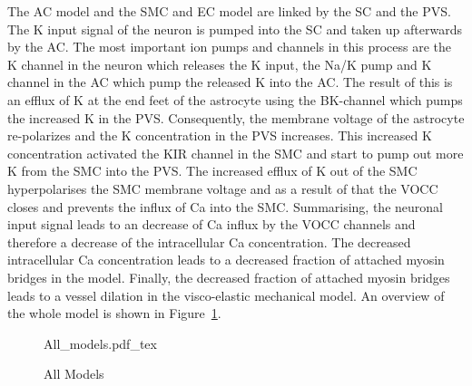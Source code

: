 The \gls{AC} model and the \gls{SMC} and \gls{EC} model are linked by the SC and the \gls{PVS}. The \gls{K} input signal of the neuron is pumped into the \gls{SC} and taken up afterwards by the AC. The most important ion pumps and channels in this process are the \gls{K} channel in the neuron which releases the \gls{K} input,  the \gls{Na}/\gls{K} pump and \gls{K} channel in the \gls{AC} which pump the released \gls{K} into the AC.
The result of this is an efflux of \gls{K} at the end feet of the astrocyte using the BK-channel which pumps the increased \gls{K} in the \gls{PVS}. Consequently, the membrane voltage of the astrocyte re-polarizes and the \gls{K} concentration in the PVS increases. This increased \gls{K} concentration activated the KIR channel in the \gls{SMC} and start to pump out more \gls{K} from the \gls{SMC} into the \gls{PVS}. The increased efflux of \gls{K} out of the SMC hyperpolarises the \gls{SMC} membrane voltage and as a result of that the VOCC closes and prevents the influx of \gls{Ca} into the \gls{SMC}.
Summarising, the neuronal input signal leads to an decrease of \gls{Ca} influx by the VOCC channels and therefore a decrease of the intracellular \gls{Ca} concentration. The decreased intracellular \gls{Ca} concentration leads to a decreased fraction of attached myosin bridges in the \citet{Hai1989} model.
Finally, the decreased fraction of attached myosin bridges leads to a vessel dilation in the visco-elastic mechanical model. An overview of the whole model is shown in Figure~\ref{Overview}.

\begin{figure}[h!]
  \centering
  \def\svgwidth{450pt}
  \scriptsize 
  {All_models.pdf_tex}
  \caption{All Models}
\label{Overview}
\end{figure}







